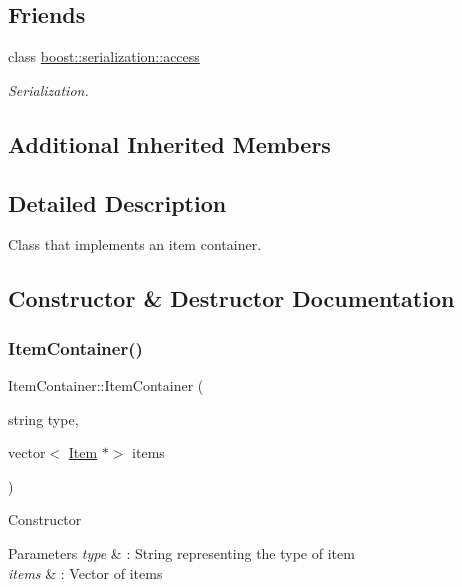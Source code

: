 \subsection*{Friends}
\begin{DoxyCompactItemize}
\item 
\hypertarget{class_item_container_ac98d07dd8f7b70e16ccb9a01abf56b9c}{}\label{class_item_container_ac98d07dd8f7b70e16ccb9a01abf56b9c} 
class \hyperlink{class_item_container_ac98d07dd8f7b70e16ccb9a01abf56b9c}{boost\+::serialization\+::access}
\begin{DoxyCompactList}\small\item\em Serialization. \end{DoxyCompactList}\end{DoxyCompactItemize}
\subsection*{Additional Inherited Members}


\subsection{Detailed Description}
Class that implements an item container. 

\subsection{Constructor \& Destructor Documentation}
\hypertarget{class_item_container_ad899d6d3519f2bc7295d0627ebff3303}{}\label{class_item_container_ad899d6d3519f2bc7295d0627ebff3303} 
\subsubsection{\texorpdfstring{Item\+Container()}{ItemContainer()}\hspace{0.1cm}{\footnotesize\ttfamily [1/2]}}
{\footnotesize\ttfamily Item\+Container\+::\+Item\+Container (\begin{DoxyParamCaption}\item[{string}]{type,  }\item[{vector$<$ \hyperlink{class_item}{Item} $\ast$$>$}]{items }\end{DoxyParamCaption})}

Constructor 
\begin{DoxyParams}{Parameters}
{\em type} & \+: String representing the type of item \\
\hline
{\em items} & \+: Vector of items \\
\hline
\end{DoxyParams}
\hypertarget{class_item_container_a1bb504a29d6b13f124a9e10db665ffb8}{}\label{class_item_container_a1bb504a29d6b13f124a9e10db665ffb8} 
